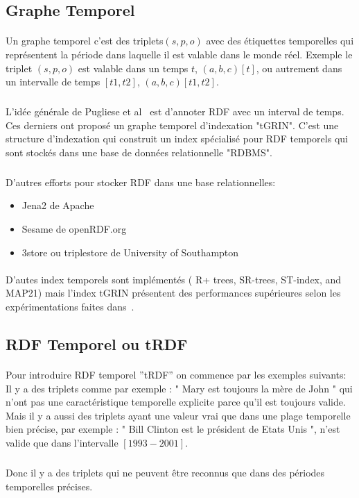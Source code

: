 \documentclass[12pt,a4	]{report}
\begin{document}
\subsection*{Graphe Temporel}
\paragraph{}
Un graphe temporel c'est des triplets$(s,p,o)$ avec des étiquettes temporelles qui représentent la période dans laquelle il est valable dans le monde réel.
Exemple le triplet $(s,p,o)$ est valable dans un temps $t$, $(a,b,c)[t]$, ou autrement dans un intervalle de temps $[t1,t2]$, $(a,b,c)[t1,t2]$.
\subparagraph{}
L'idée générale de Pugliese et al~\cite{pugliese2008} est d'annoter RDF avec un interval de temps.
Ces derniers ont proposé un graphe temporel d'indexation "tGRIN". C'est une structure d’indexation qui construit un index spécialisé pour RDF temporels qui sont stockés dans une base de données relationnelle "RDBMS".
\subparagraph{}
D’autres efforts pour stocker RDF dans une base relationnelles:
\begin{itemize}
\item Jena2 de Apache
\item Sesame de openRDF.org
\item 3store ou triplestore de University of Southampton
\end{itemize}
\paragraph{}
D'autes index temporels sont implémentés ( R+ trees, SR-trees, ST-index, and MAP21) mais l'index tGRIN présentent des performances supérieures selon les expérimentations faites dans~\cite{pugliese2008}.
\subsection*{RDF Temporel ou tRDF}
\paragraph{}
Pour introduire RDF temporel ''tRDF'' on commence par les exemples suivants:
\newline
Il y a des triplets comme par exemple : " Mary est toujours la mère de John " qui n'ont pas une caractéristique temporelle explicite parce qu'il est toujours valide. Mais il y a aussi des triplets ayant une valeur vrai que dans une plage temporelle bien précise, par exemple : " Bill Clinton est le président de Etats Unis ", n'est valide que dans l'intervalle $[1993-2001]$.   
\subparagraph{}
Donc il y a des triplets qui ne peuvent être reconnus que dans des périodes temporelles précises.
\end{document}

